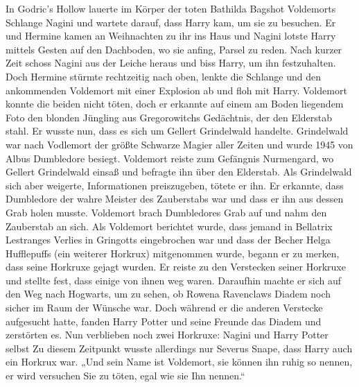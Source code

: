\documentclass[a4paper, 10pt]{article}
\begin{document}
\vspace{10pt}
\newline
In Godric's Hollow lauerte im Körper der toten Bathilda Bagshot Voldemorts Schlange Nagini und wartete darauf, dass Harry kam, um sie zu besuchen. Er und Hermine kamen an Weihnachten zu ihr ins Haus und Nagini lotste Harry mittels Gesten auf den Dachboden, wo sie anfing, Parsel zu reden. Nach kurzer Zeit schoss Nagini aus der Leiche heraus und biss Harry, um ihn festzuhalten. Doch Hermine stürmte rechtzeitig nach oben, lenkte die Schlange und den ankommenden Voldemort mit einer Explosion ab und floh mit Harry. Voldemort konnte die beiden nicht töten, doch er erkannte auf einem am Boden liegendem Foto den blonden Jüngling aus Gregorowitchs Gedächtnis, der den Elderstab stahl. Er wusste nun, dass es sich um Gellert Grindelwald handelte. Grindelwald war nach Vodlemort der größte Schwarze Magier aller Zeiten und wurde 1945 von Albus Dumbledore besiegt.
\vspace{10pt}
\newline
Voldemort reiste zum Gefängnis Nurmengard, wo Gellert Grindelwald einsaß und befragte ihn über den Elderstab. Als Grindelwald sich aber weigerte, Informationen preiszugeben, tötete er ihn. Er erkannte, dass Dumbledore der wahre Meister des Zauberstabs war und dass er ihn aus dessen Grab holen musste. Voldemort brach Dumbledores Grab auf und nahm den Zauberstab
an sich.
\vspace{10pt}
\newline
Als Voldemort berichtet wurde, dass jemand in Bellatrix Lestranges Verlies in Gringotts eingebrochen war und  dass der Becher Helga Hufflepuffs (ein weiterer Horkrux) mitgenommen wurde, begann er zu merken, dass seine Horkruxe gejagt wurden. Er reiste zu den Verstecken seiner Horkruxe und stellte fest, dass einige von ihnen weg waren. Daraufhin machte er sich auf den Weg nach Hogwarts, um zu sehen, ob Rowena Ravenclaws Diadem noch sicher im Raum der Wünsche war. Doch während er die anderen Verstecke aufgesucht hatte, fanden Harry Potter und seine Freunde das Diadem und zerstörten es. Nun verblieben noch zwei Horkruxe: Nagini und Harry Potter selbst Zu diesem Zeitpunkt wusste allerdings nur Severus Snape, dass Harry auch ein Horkrux war.
\vspace{10pt}
\newline
„Und sein Name ist Voldemort, sie können ihn ruhig so nennen, er wird versuchen Sie zu töten, egal wie sie Ihn nennen.“
\vspace{10pt}
\newline
\end{document}
